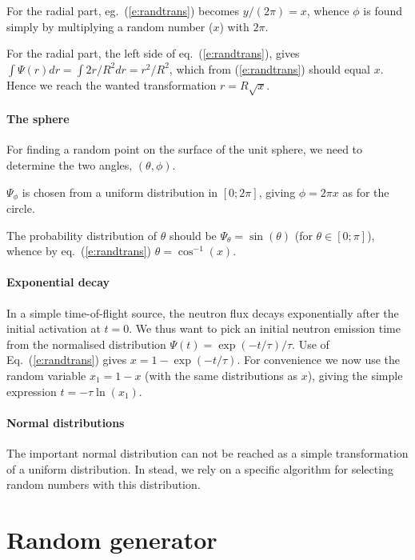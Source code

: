 For the radial part,
eg.~(\ref{e:randtrans}) becomes $y/(2 \pi) = x$, whence
$\phi$ is found simply by multiplying a random number ($x$)
with $2\pi$.

For the radial part, the left side of eq.~(\ref{e:randtrans}), gives
$\int \Psi(r) dr = \int 2 r/R^2 dr = r^2/R^2$,
which from (\ref{e:randtrans}) should equal $x$.
Hence we reach the wanted transformation $r = R\sqrt{x}$.

\paragraph{The sphere}
For finding a random point on the surface of the unit sphere,
we need to determine the two angles, $(\theta, \phi)$.

$\Psi_\phi$ is chosen from a uniform distribution
in $[0; 2\pi]$, giving $\phi = 2\pi x$ as for the circle.

The probability distribution of $\theta$ should be
$\Psi_\theta=\sin(\theta)$ (for $\theta \in [0; \pi ]$),
whence by eq.~(\ref{e:randtrans}) $\theta=\cos^{-1}(x)$.

\paragraph{Exponential decay}
In a simple time-of-flight source, the neutron flux decays exponentially
after the initial activation at $t=0$. We thus want to pick an initial
neutron emission time from the normalised distribution
$\Psi(t) = \exp(-t/\tau) / \tau$.
Use of Eq.~(\ref{e:randtrans}) gives
$x = 1 - \exp(-t/\tau)$. For convenience we now use the random variable
$x_1 = 1-x$ (with the same distributions as $x$),
giving the simple expression $t = - \tau \ln (x_1)$.

\paragraph{Normal distributions}
The important normal distribution can not be reached as a simple
transformation of a uniform distribution.
In stead, we rely on a specific algorithm for selecting random
numbers with this distribution.

\section{Random generator}

